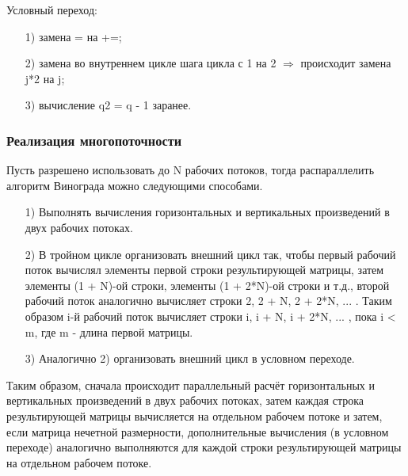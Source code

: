 \documentclass[a4paper,14pt]{article}
\begin{document}
	Условный переход:
	\begin{enumerate} 
	\item[1)] замена = на +=;
	\item[2)] замена во внутреннем цикле шага цикла с 1 на 2 $\Rightarrow$ происходит замена j*2 на j;
	\item[3)] вычисление q2 = q - 1 заранее.
	\end{enumerate}
    
    \subsubsection{Реализация многопоточности}
    Пусть разрешено использовать до N рабочих потоков, тогда распараллелить алгоритм Винограда можно следующими способами.
	  \begin{enumerate}
	  \item[1)] Выполнять вычисления горизонтальных и вертикальных произведений в двух рабочих потоках.
	  \item[2)] В тройном цикле организовать внешний цикл так, чтобы первый рабочий поток вычислял элементы первой строки результирующей матрицы, затем элементы (1 + N)-ой строки, элементы (1 + 2*N)-ой строки и т.д., второй рабочий поток аналогично вычисляет строки 2, 2 + N, 2 + 2*N, ... . Таким образом i-й рабочий поток вычисляет строки i, i + N, i + 2*N, ... , пока i < m, где m - длина первой матрицы.
	  \item[3)] Аналогично 2) организовать внешний цикл в условном переходе.
	  \end{enumerate}
	  
	  Таким образом, сначала происходит параллельный расчёт горизонтальных и вертикальных произведений в двух рабочих потоках, затем каждая строка результирующей матрицы вычисляется на отдельном рабочем потоке и затем, если матрица нечетной размерности, дополнительные вычисления (в условном переходе) аналогично выполняются для каждой строки результирующей матрицы на отдельном рабочем потоке.
	    
\end{document}
